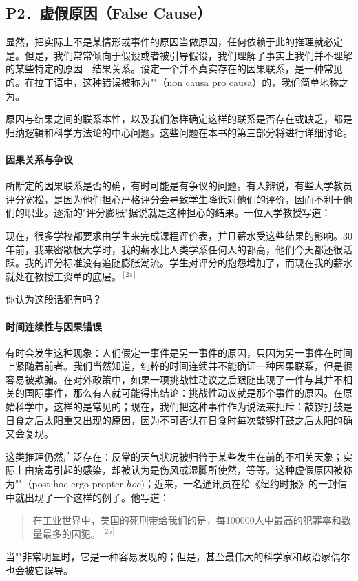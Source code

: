 \subsection{P2．虚假原因（False Cause）}

\begin{theorembox}[title=虚假原因谬误的定义]
显然，把实际上不是某情形或事件的原因当做原因，任何依赖于此的推理就必定是。但是，我们常常倾向于假设或者被引导假设，我们理解了事实上我们并不理解的某些特定的原因—结果关系。设定一个并不真实存在的因果联系，是一种常见的。在拉丁语中，这种错误被称为""（non causa pro causa）的，我们简单地称之为。
\end{theorembox}

原因与结果之间的联系本性，以及我们怎样确定这样的联系是否存在或缺乏，都是归纳逻辑和科学方法论的中心问题。这些问题在本书的第三部分将进行详细讨论。

\paragraph{因果关系与争议}
\begin{examplebox}[title=因果关系与争议]
所断定的因果联系是否的确，有时可能是有争议的问题。有人辩说，有些大学教员评分宽松，是因为他们担心严格评分会导致学生降低对他们的评价，因而不利于他们的职业。逐渐的"评分膨胀"据说就是这种担心的结果。一位大学教授写道：

现在，很多学校都要求由学生来完成课程评价表，并且薪水受这些结果的影响。30年前，我来密歇根大学时，我的薪水比人类学系任何人的都高，他们今天都还很活跃。我的评分标准没有追随膨胀潮流。学生对评分的抱怨增加了，而现在我的薪水就处在教授工资单的底层。${ }^{[24]}$

你认为这段话犯有吗？
\end{examplebox}

\paragraph{时间连续性与因果错误}
有时会发生这种现象：人们假定一事件是另一事件的原因，只因为另一事件在时间上紧随着前者。我们当然知道，纯粹的时间连续并不能确证一种因果联系，但是很容易被欺骗。在对外政策中，如果一项挑战性动议之后跟随出现了一件与其并不相关的国际事件，那么有人就可能得出结论：挑战性动议就是那个事件的原因。在原始科学中，这样的是常见的；现在，我们把这种事件作为说法来拒斥：敲锣打鼓是日食之后太阳重又出现的原因，因为不可否认在日食时每次敲锣打鼓之后太阳的确又会复现。

这类推理仍然广泛存在：反常的天气状况被归咎于某些发生在前的不相关天象；实际上由病毒引起的感染，却被认为是伤风或湿脚所使然，等等。这种虚假原因被称为""（post hoc ergo propter $h o c)$；近来，一名通讯员在给《纽约时报》的一封信中就出现了一个这样的例子。他写道：

\begin{quote}
在工业世界中，美国的死刑带给我们的是，每100000人中最高的犯罪率和数量最多的囚犯。${ }^{[25]}$
\end{quote}

当""非常明显时，它是一种容易发现的；但是，甚至最伟大的科学家和政治家偶尔也会被它误导。